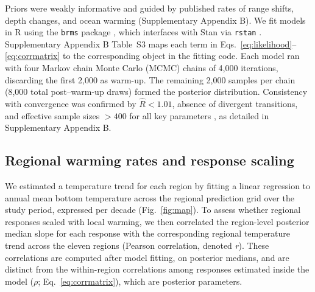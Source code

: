 \documentclass[9pt,twocolumn,twoside]{pnas-new}
\providecommand{\DIFaddend}{} %
\providecommand{\DIFdelbegin}{} %
\begin{document}
{Priors were weakly informative and guided by published rates of range shifts, depth changes, and ocean warming (Supplementary Appendix B). We fit models in R using the \texttt{brms} package \citep{burkner_brms_2017}, which interfaces with Stan via \texttt{rstan} \citep{stan2024,stan_development_team_rstan_2024}. Supplementary Appendix B Table~S3 maps each term in Eqs.~\ref{eq:likelihood}--\ref{eq:corrmatrix} to the corresponding object in the fitting code. Each model ran with four Markov chain Monte Carlo (MCMC) chains of 4,000 iterations, discarding the first 2,000 as warm-up. The remaining 2,000 samples per chain (8,000 total post–warm-up draws) formed the posterior distribution. Consistency with convergence was confirmed by $\hat{R} < 1.01$, absence of divergent transitions, and effective sample sizes $> 400$ for all key parameters \citep{vehtari_rank-normalization_2021}, as detailed in Supplementary Appendix B.

\subsection*{Regional warming rates and response scaling}
We estimated a temperature trend for each region by fitting a linear regression to annual mean bottom temperature across the regional prediction grid over the study period, expressed per decade (Fig.~\ref{fig:map}). To assess whether regional responses scaled with local warming, we then correlated the region-level posterior median slope for each response with the corresponding regional temperature trend across the eleven regions (Pearson correlation, denoted \textit{r}). These correlations are computed after model fitting, on posterior medians, and are distinct from the within-region correlations among responses estimated inside the model ($\rho$; Eq.~\ref{eq:corrmatrix}), which are posterior parameters.
}
\DIFaddend 


\DIFdelbegin %


\end{document}
